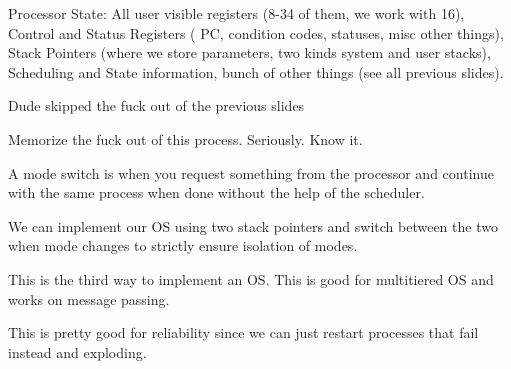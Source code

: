 \documentclass[12pt]{article}
\begin{document}







Processor State: All user visible registers (8-34 of them, we work with 16), Control and Status Registers ( PC, condition codes, statuses, misc other things), Stack Pointers (where we store parameters, two kinds system and user stacks), Scheduling and State information, bunch of other things (see all previous slides).








Dude skipped the fuck out of the previous slides





















Memorize the fuck out of this process. Seriously. Know it.


A mode switch is when you request something from the processor and continue with the same process when done without the help of the scheduler.

We can implement our OS using two stack pointers and switch between the two when mode changes to strictly ensure isolation of modes.

This is the third way to implement an OS. This is good for multitiered OS and works on message passing.

This is pretty good for reliability since we can just restart processes that fail instead and exploding.
\end{document}
